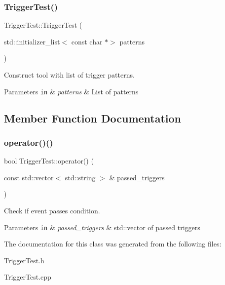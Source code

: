 \subsubsection{\texorpdfstring{Trigger\+Test()}{TriggerTest()}}
{\footnotesize\ttfamily Trigger\+Test\+::\+Trigger\+Test (\begin{DoxyParamCaption}\item[{std\+::initializer\+\_\+list$<$ const char $\ast$$>$}]{patterns }\end{DoxyParamCaption})}



Construct tool with list of trigger patterns. 


\begin{DoxyParams}[1]{Parameters}
\mbox{\tt in}  & {\em patterns} & List of patterns \\
\hline
\end{DoxyParams}


\subsection{Member Function Documentation}
\mbox{\label{classTriggerTest_ab05af0ca18b7b4d0ae0156ee26891d3e}} 
\subsubsection{\texorpdfstring{operator()()}{operator()()}}
{\footnotesize\ttfamily bool Trigger\+Test\+::operator() (\begin{DoxyParamCaption}\item[{const std\+::vector$<$ std\+::string $>$ \&}]{passed\+\_\+triggers }\end{DoxyParamCaption})}



Check if event passes condition. 


\begin{DoxyParams}[1]{Parameters}
\mbox{\tt in}  & {\em passed\+\_\+triggers} & std\+::vector of passed triggers \\
\hline
\end{DoxyParams}


The documentation for this class was generated from the following files\+:\begin{DoxyCompactItemize}
\item 
Trigger\+Test.\+h\item 
Trigger\+Test.\+cpp\end{DoxyCompactItemize}
